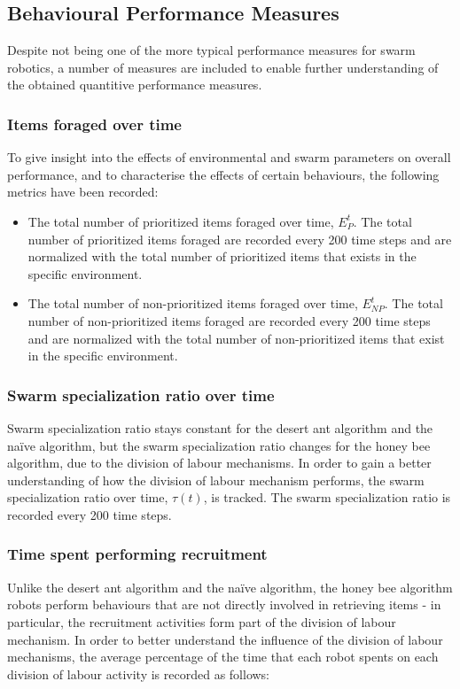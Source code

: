\documentclass[preprint,12pt]{elsarticle}
\begin{document}
\subsection{Behavioural Performance Measures}
\label{behaviouralperformancemeasures}

Despite not being one of the more typical performance measures for swarm robotics, a number of measures are included to enable further understanding of the obtained quantitive performance measures.

\subsubsection{Items foraged over time}
To give insight into the effects of environmental and swarm parameters on overall performance, and to characterise the effects of certain behaviours, the following metrics have been recorded:

\begin{itemize}
\item The total number of prioritized items foraged over time, $E^t_P$. The total number of prioritized items foraged are recorded every 200 time steps and are normalized with the total number of prioritized items that exists in the specific environment.
\item The total number of non-prioritized items foraged over time, $E^t_{NP}$. The total number of non-prioritized items foraged are recorded every 200 time steps and are normalized with the total number of non-prioritized items that exist in the specific environment.
\end{itemize}

\subsubsection{Swarm specialization ratio over time}
Swarm specialization ratio stays constant for the desert ant algorithm and the na\"ive algorithm, but the swarm specialization ratio changes for the honey bee algorithm, due to the division of labour mechanisms. In order to gain a better understanding of how the division of labour mechanism performs, the swarm specialization ratio over time, $\tau(t)$, is tracked. The swarm specialization ratio is recorded every 200 time steps.

\subsubsection{Time spent performing recruitment}
Unlike the desert ant algorithm and the na\"ive algorithm, the honey bee algorithm robots perform behaviours that are not directly involved in retrieving items - in particular, the recruitment activities form part of the division of labour mechanism. In order to better understand the influence of the division of labour mechanisms, the average percentage of the time that each robot spents on each division of labour activity is recorded as follows:
\end{document}
